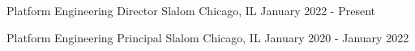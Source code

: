 

\begin{cventries}

  \cventry
    {Platform Engineering Director} %
    {Slalom} %
    {Chicago, IL} %
    {January 2022 - Present} %
    {
      \begin{cvitems} %
      \end{cvitems}
    }

  \cventry
    {Platform Engineering Principal} %
    {Slalom} %
    {Chicago, IL} %
    {January 2020 - January 2022} %
    {
      \begin{cvitems} %
      \end{cvitems}
    }


\end{cventries}
